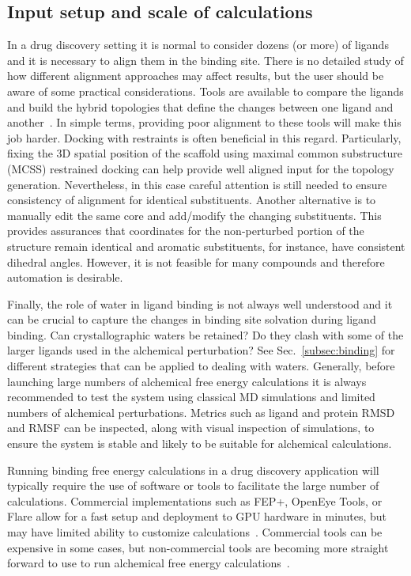\documentclass[9pt,bestpractices]{livecoms}
\begin{document}
\subsection{Input setup and scale of calculations}
In a drug discovery setting it is normal to consider dozens (or more) of ligands and it is necessary to align them in the binding site. There is no detailed study of how different alignment approaches may affect results, but the user should be aware of some practical considerations. Tools are available to compare the ligands and build the hybrid topologies that define the changes between one ligand and another~\cite{loeffler2015fesetup,hedges2019biosimspace,gapsys2015pmx}. In simple terms, providing poor alignment to these tools will make this job harder. Docking with restraints is often beneficial in this regard. Particularly, fixing the 3D spatial position of the scaffold using maximal common substructure (MCSS) restrained docking can help provide well aligned input for the topology generation. Nevertheless, in this case careful attention is still needed to ensure consistency of alignment for identical substituents. Another alternative is to manually edit the same core and add/modify the changing substituents. This provides assurances that coordinates for the non-perturbed portion of the structure remain identical and aromatic substituents, for instance, have consistent dihedral angles. However, it is not feasible for many compounds and therefore automation is desirable. 

Finally, the role of water in ligand binding is not always well understood and it can be crucial to capture the changes in binding site solvation during ligand binding. Can crystallographic waters be retained? Do they clash with some of the larger ligands used in the alchemical perturbation? See Sec.~\ref{subsec:binding} for different strategies that can be applied to dealing with waters. Generally, before launching large numbers of alchemical free energy calculations it is always recommended to test the system using classical MD simulations and limited numbers of alchemical perturbations. Metrics such as ligand and protein RMSD and RMSF can be inspected, along with visual inspection of simulations, to ensure the system is stable and likely to be suitable for alchemical calculations. 

Running binding free energy calculations in a drug discovery application will typically require the use of software or tools to facilitate the large number of calculations. Commercial implementations such as FEP+, OpenEye Tools, or Flare allow for a fast setup and deployment to GPU hardware in minutes, but may have limited ability to customize calculations~\cite{wang2015accurate,kuhn2020assessment}. Commercial tools can be expensive in some cases, but non-commercial tools are becoming more straight forward to use to run alchemical free energy calculations~\cite{gapsys2015pmx, loeffler2015fesetup, song2019using, gapsys2020large, jespers2019qligfep, hedges2019biosimspace, kuhn2020assessment}.
\end{document}
